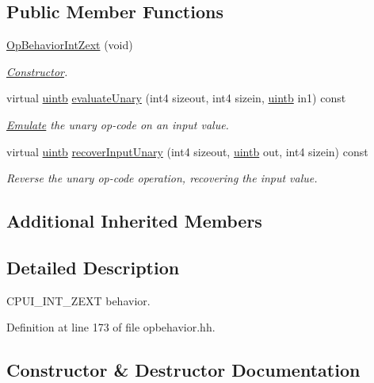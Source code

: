 \subsection*{Public Member Functions}
\begin{DoxyCompactItemize}
\item 
\mbox{\hyperlink{class_op_behavior_int_zext_adffd68c00af353947d996e31c6777708}{Op\+Behavior\+Int\+Zext}} (void)
\begin{DoxyCompactList}\small\item\em \mbox{\hyperlink{class_constructor}{Constructor}}. \end{DoxyCompactList}\item 
virtual \mbox{\hyperlink{types_8h_a2db313c5d32a12b01d26ac9b3bca178f}{uintb}} \mbox{\hyperlink{class_op_behavior_int_zext_a0a8353aa8b8077323467384e4879268e}{evaluate\+Unary}} (int4 sizeout, int4 sizein, \mbox{\hyperlink{types_8h_a2db313c5d32a12b01d26ac9b3bca178f}{uintb}} in1) const
\begin{DoxyCompactList}\small\item\em \mbox{\hyperlink{class_emulate}{Emulate}} the unary op-\/code on an input value. \end{DoxyCompactList}\item 
virtual \mbox{\hyperlink{types_8h_a2db313c5d32a12b01d26ac9b3bca178f}{uintb}} \mbox{\hyperlink{class_op_behavior_int_zext_a2762161ee75712691880698edf9576c1}{recover\+Input\+Unary}} (int4 sizeout, \mbox{\hyperlink{types_8h_a2db313c5d32a12b01d26ac9b3bca178f}{uintb}} out, int4 sizein) const
\begin{DoxyCompactList}\small\item\em Reverse the unary op-\/code operation, recovering the input value. \end{DoxyCompactList}\end{DoxyCompactItemize}
\subsection*{Additional Inherited Members}


\subsection{Detailed Description}
C\+P\+U\+I\+\_\+\+I\+N\+T\+\_\+\+Z\+E\+XT behavior. 

Definition at line 173 of file opbehavior.\+hh.



\subsection{Constructor \& Destructor Documentation}
\mbox{\label{class_op_behavior_int_zext_adffd68c00af353947d996e31c6777708}} 
